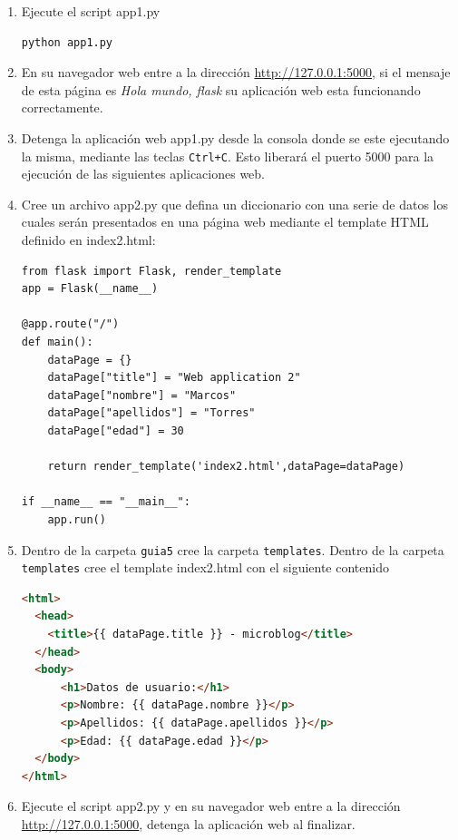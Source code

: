\documentclass[10pt,letterpaper]{article}
\begin{document}
\begin{enumerate}
\item Ejecute el script app1.py
\begin{verbatim}
python app1.py
\end{verbatim}

\item En su navegador web entre a la dirección \url{http://127.0.0.1:5000}, si el mensaje de esta página es \textit{Hola mundo, flask} su aplicación web esta funcionando correctamente.

\item Detenga la aplicación web app1.py desde la consola donde se este ejecutando la misma, mediante las teclas \verb|Ctrl+C|. Esto liberará el puerto 5000 para la ejecución de las siguientes aplicaciones web. 

\newpage
\item Cree un archivo app2.py que defina un diccionario con una serie de datos los cuales serán presentados en una página web mediante el template HTML definido en index2.html: 
\begin{lstlisting}[style=myCustomPythonStyle]
from flask import Flask, render_template
app = Flask(__name__)

@app.route("/")
def main():
    dataPage = {}
    dataPage["title"] = "Web application 2"
    dataPage["nombre"] = "Marcos"
    dataPage["apellidos"] = "Torres"
    dataPage["edad"] = 30

    return render_template('index2.html',dataPage=dataPage)

if __name__ == "__main__":
    app.run()
\end{lstlisting}

\item Dentro de la carpeta \verb|guia5| cree la carpeta \verb|templates|. Dentro de la carpeta \verb|templates| cree el template index2.html con el siguiente contenido
\begin{lstlisting}[language=html,basicstyle=\footnotesize,frame=tb,columns=fullflexible]
<html>
  <head>
    <title>{{ dataPage.title }} - microblog</title>
  </head>
  <body>
      <h1>Datos de usuario:</h1>
      <p>Nombre: {{ dataPage.nombre }}</p>
      <p>Apellidos: {{ dataPage.apellidos }}</p>
      <p>Edad: {{ dataPage.edad }}</p>
  </body>
</html>
\end{lstlisting}

\item Ejecute el script app2.py y en su navegador web entre a la dirección \url{http://127.0.0.1:5000}, detenga la aplicación web al finalizar. 


\end{enumerate}
\end{document}

